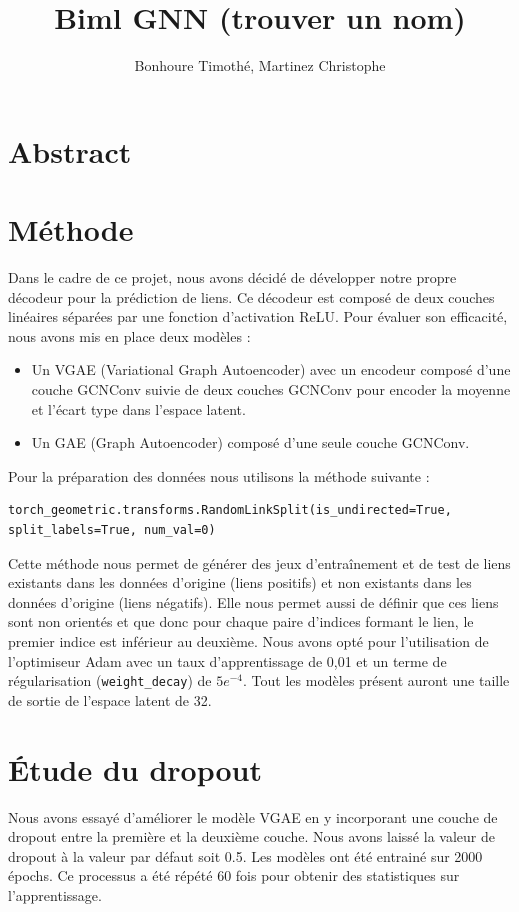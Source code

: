 \documentclass{article}
\begin{document}
\title{Biml GNN (trouver un nom)}
\author{Bonhoure Timothé, Martinez Christophe}                      %

\maketitle
\tableofcontents
\section*{Abstract}
\newpage

\section{Méthode}

Dans le cadre de ce projet, nous avons décidé de développer notre propre décodeur pour la prédiction de liens. Ce décodeur est composé de deux couches linéaires séparées par une fonction d'activation ReLU. Pour évaluer son efficacité, nous avons mis en place deux modèles :
\begin{itemize}
    \item Un VGAE (Variational Graph Autoencoder) avec un encodeur composé d'une couche GCNConv suivie de deux couches GCNConv pour encoder la moyenne et l'écart type dans l'espace latent.
    \item Un GAE (Graph Autoencoder) composé d'une seule couche GCNConv.
\end{itemize}
Pour la préparation des données nous utilisons la méthode suivante :
\begin{verbatim}
torch_geometric.transforms.RandomLinkSplit(is_undirected=True, split_labels=True, num_val=0)
\end{verbatim}
Cette méthode nous permet de générer des jeux d’entraînement et de test de liens existants dans les données d'origine (liens positifs) et non existants dans les données d'origine (liens négatifs). Elle nous permet aussi de définir que ces liens sont non orientés et que donc pour chaque paire d’indices formant le lien, le premier indice est inférieur au deuxième.
Nous avons opté pour l'utilisation de l'optimiseur Adam avec un taux d'apprentissage de 0,01 et un terme de régularisation (\texttt{weight\_decay}) de \(5e^{-4}\).
Tout les modèles présent auront une taille de sortie de l'espace latent de 32. 

\section{Étude du dropout}
Nous avons essayé d'améliorer le modèle VGAE en y incorporant une couche de dropout entre la première et la deuxième couche. 
Nous avons laissé la valeur de dropout à la valeur par défaut soit 0.5. 
Les modèles ont été entrainé sur 2000 épochs. 
Ce processus a été répété 60 fois pour obtenir des statistiques sur l'apprentissage.
\end{document}
